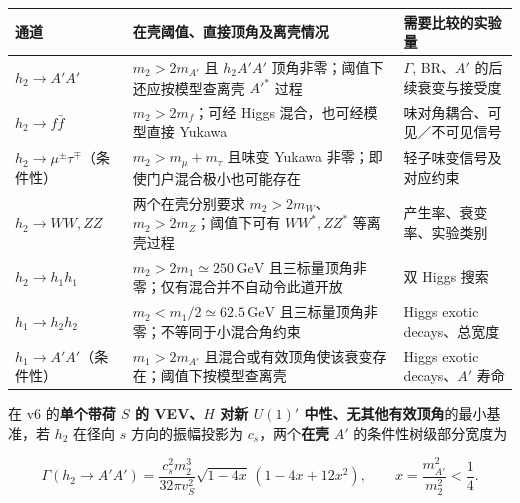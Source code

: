 \documentclass[
  chinese,
  UTF8]{ctexart}
\newcounter{none} %
\begin{document}
{\def\LTcaptype{none} %
\begin{longtable}[]{@{}
  >{\raggedright\arraybackslash}p{}
  >{\raggedright\arraybackslash}p{}
  >{\raggedright\arraybackslash}p{}@{}}
\toprule\noalign{}
\begin{minipage}[b]{\linewidth}\raggedright
通道
\end{minipage} & \begin{minipage}[b]{\linewidth}\raggedright
在壳阈值、直接顶角及离壳情况
\end{minipage} & \begin{minipage}[b]{\linewidth}\raggedright
需要比较的实验量
\end{minipage} \\
\midrule\noalign{}
\endhead
\bottomrule\noalign{}
\endlastfoot
\(h_2\to A'A'\) & \(m_2>2m_{A'}\) 且 \(h_2A'A'\)
顶角非零；阈值下还应按模型查离壳 \(A'^{*}\) 过程 & \(\Gamma\),
BR、\(A'\) 的后续衰变与接受度 \\
\(h_2\to f\bar f\) & \(m_2>2m_f\)；可经 Higgs 混合，也可经模型直接
Yukawa & 味对角耦合、可见／不可见信号 \\
\(h_2\to\mu^\pm\tau^\mp\)（条件性） & \(m_2>m_\mu+m_\tau\) 且味变 Yukawa
非零；即使门户混合极小也可能存在 & 轻子味变信号及对应约束 \\
\(h_2\to WW,ZZ\) & 两个在壳分别要求
\(m_2>2m_W\)、\(m_2>2m_Z\)；阈值下可有 \(WW^{*},ZZ^{*}\) 等离壳过程 &
产生率、衰变率、实验类别 \\
\(h_2\to h_1h_1\) & \(m_2>2m_1\simeq250\,\mathrm{GeV}\)
且三标量顶角非零；仅有混合并不自动令此道开放 & 双 Higgs 搜索 \\
\(h_1\to h_2h_2\) & \(m_2<m_1/2\simeq62.5\,\mathrm{GeV}\)
且三标量顶角非零；不等同于小混合角约束 & Higgs exotic decays、总宽度 \\
\(h_1\to A'A'\)（条件性） & \(m_1>2m_{A'}\)
且混合或有效顶角使该衰变存在；阈值下按模型查离壳 & Higgs exotic
decays、\(A'\) 寿命 \\
\end{longtable}
}

在 v6 的\textbf{单个带荷 \(S\) 的 VEV、\(H\) 对新 \(U(1)'\)
中性、无其他有效顶角}的最小基准，若 \(h_2\) 在径向 \(s\)
方向的振幅投影为 \(c_s\)，两个\textbf{在壳} \(A'\)
的条件性树级部分宽度为

\[
\Gamma(h_2\to A'A')=\frac{c_s^2m_2^3}{32\pi v_S^2}\sqrt{1-4x}\,(1-4x+12x^2),\qquad x=\frac{m_{A'}^2}{m_2^2}<\frac14.
\]
\end{document}
